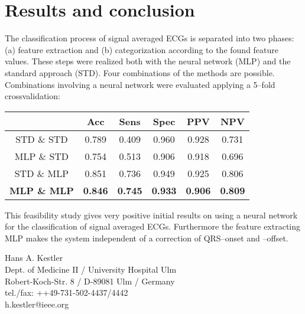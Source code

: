 \documentclass[twocolumn]{cinc}
\begin{document}
\vspace*{-2mm}
\section{Results and conclusion}

The classification process of signal averaged ECGs is separated into two phases: (a) feature extraction
and (b) categorization according to the found feature values. These steps were realized both with the
neural network (MLP) and the standard approach (STD). Four combinations of the methods are possible.
Combinations involving a neural network were evaluated applying a 5--fold crossvalidation:
\begin{center}
\small
\begin{tabular}{|c||c|c|c|c|c|}\hline
           & Acc  & Sens & Spec & PPV   & NPV   \\ \hline \hline
STD \& STD & 0.789     & 0.409       & 0.960       & 0.928 & 0.731 \\ \hline
MLP \& STD & 0.754     & 0.513       & 0.906       & 0.918 & 0.696 \\ \hline
STD \& MLP & 0.851     & 0.736       & 0.949       & 0.925 & 0.806 \\ \hline 
{\bf MLP \& MLP} & {\bf 0.846}     &{\bf 0.745}       & {\bf 0.933}       & {\bf 0.906} & {\bf 0.809}\\ \hline
\end{tabular}
\end{center}
{ This feasibility study gives very positive initial results on using a neural
network for the classification of signal averaged ECGs. Furthermore the feature extracting MLP
makes the system independent of a correction of QRS--onset and --offset.}


\vspace*{-2mm}


\begin{correspondence}
Hans A. Kestler\\
Dept. of Medicine II / University Hospital Ulm\\
Robert-Koch-Str. 8 / D-89081 Ulm / Germany\\
tel./fax: ++49-731-502-4437/4442\\
h.kestler@ieee.org
\end{correspondence}
\end{document}
